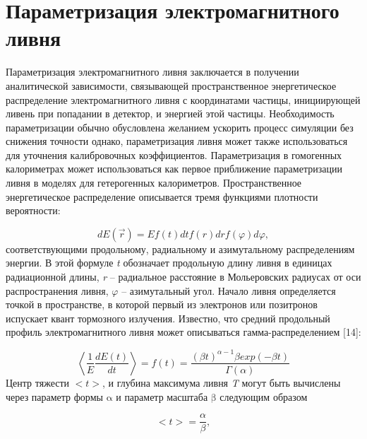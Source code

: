 \newpage
\section{Параметризация электромагнитного ливня}  \label{chap4}   

Параметризация электромагнитного  ливня заключается  в  получении аналитической зависимости, связывающей пространственное энергетическое распределение   электромагнитного   ливня   с   координатами   частицы, инициирующей ливень при попадании в детектор, и энергией этой частицы. Необходимость   параметризации обычно обусловлена   желанием ускорить процесс симуляции без снижения точности однако, параметризация ливня  может  также  использоваться  для  уточнения  калибровочных коэффициентов. Параметризация в гомогенных калориметрах может использоваться как первое приближение параметризации ливня в моделях для гетерогенных калориметров. Пространственное  энергетическое  распределение  описывается  тремя функциями плотности вероятности:

\begin{equation}\label{eq:dE}
dE(\vec{r}) = Ef(t)dtf(r)drf(\varphi)d\varphi, 
\end{equation}
соответствующими   продольному,   радиальному   и   азимутальному распределениям  энергии. В  этой  формуле \textit{t} обозначает  продольную  длину ливня  в  единицах  радиационной  длины, \textit{r} – радиальное  расстояние  в Мольеровских  радиусах  от  оси  распространения  ливня, $\varphi$ -- азимутальный угол. Начало ливня определяется точкой в пространстве, в которой первый из электронов или позитронов испускает квант тормозного излучения. Известно, что средний продольный профиль электромагнитного ливня может описываться гамма-распределением [14]:

\begin{equation}\label{eq:longProf}
\left< 
\frac{1}{E}\frac{dE(t)}{dt}
\right>
= f(t) 
= \frac{ (\beta t )^{ \alpha - 1 } \beta exp(-\beta t) }{\Gamma (\alpha) } 
\end{equation}
Центр тяжести $<t>$,  и  глубина  максимума  ливня \textit{T} могут  быть вычислены  через  параметр  формы $\mathrm{\alpha}$ и  параметр  масштаба $\mathrm{\beta}$ следующим образом

\begin{equation}\label{eq:gravCenter}
<t> = \frac{\alpha}{\beta},
\end{equation}

